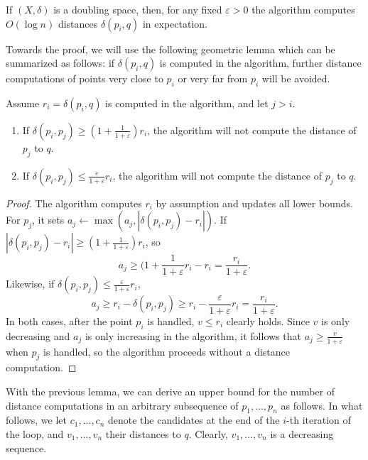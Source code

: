 \documentclass[a4paper,USenglish]{socg-lipics-v2018}
\newcommand{\eps}{\varepsilon}
\newcommand{\dist}{\delta}
\begin{document}
\begin{theorem}
\label{thm:ann_bound}
    If $(X, \dist)$ is a doubling space, then, for any fixed $\eps > 0$ the
    algorithm computes $O(\log n)$ distances $\dist(p_i, q)$ in expectation.
\end{theorem}

Towards the proof, we will use the following geometric lemma which
can be summarized as follows: if $\dist(p_i,q)$ is computed in the algorithm,
further distance computations of points very close to $p_i$ or very far from $p_i$
will be avoided.

\begin{lemma}
\label{lem:bound_lemma}
Assume $r_i=\dist(p_i,q)$ is computed in the algorithm, and let $j>i$.
\begin{enumerate}
\item If $\dist(p_i,p_j)\geq (1+\frac{1}{1+\eps}) r_i$, the algorithm will not compute the distance
of $p_j$ to $q$.
\item If $\dist(p_i,p_j)\leq\frac{\eps}{1+\eps}r_i$, the algorithm will not compute
the distance of $p_j$ to $q$.
\end{enumerate}
\end{lemma}
\begin{proof}
The algorithm computes $r_i$ by assumption and updates
all lower bounds. For $p_j$, it sets $a_j\gets \max (a_j,|\dist(p_i,p_j)-r_i|)$.
If $|\dist(p_i,p_j)-r_i|\geq (1+\frac{1}{1+\eps})r_i$,
so 
\[a_j\geq (1+\frac{1}{1+\eps}r_i - r_i = \frac{r_i}{1+\eps}.\]
Likewise, if $\dist(p_i,p_j)\leq\frac{\eps}{1+\eps}r_i$,
\[a_j\geq r_i-\dist(p_i,p_j) \geq r_i - \frac{\eps}{1+\eps}r_i = \frac{r_i}{1+\eps}.\]
In both cases, after the point $p_i$ is handled,
$v\leq r_i$ clearly holds. Since $v$ is only decreasing
and $a_j$ is only increasing in the algorithm,
it follows that $a_j\geq \frac{v}{1+\eps}$ when $p_j$ is handled,
so the algorithm proceeds without a distance computation.
\end{proof}

With the previous lemma, we can derive an upper bound for the number
of distance computations in an arbitrary subsequence of $p_1,\ldots,p_n$
as follows. In what follows, we let $c_1,\ldots,c_n$ denote the candidates
at the end of the $i$-th iteration of the loop, and $v_1,\ldots,v_n$
their distances to $q$. Clearly, $v_1,\ldots,v_n$ is a decreasing sequence.
\end{document}

